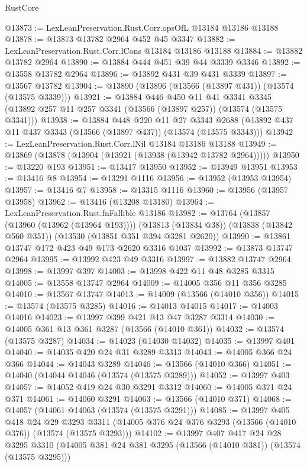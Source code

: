 \begin{lexlean}{RustCore}
\begin{coremodule}
@13873 := LexLeanPreservation.Rust.Corr.opsOfL @13184 @13186 @13188
@13878 := @13873 @13782 @2964 @452 @45 @3347
@13882 := LexLeanPreservation.Rust.Corr.lCons @13184 @13186 @13188
@13884 := @13882 @13782 @2964
@13890 := @13884 @444 @451 @39 @44 @3339 @3346
@13892 := @13558 @13782 @2964
@13896 := @13892 @431 @39 @431 @3339
@13897 := @13567 @13782
@13904 := @13890 (@13896 (@13566 (@13897 @431)) (@13574 (@13575 @3339)))
@13921 := @13884
    @446
    @450
    @11
    @41
    @3341
    @3345
    (@13892 @257 @11 @257 @3341 (@13566 (@13897 @257)) (@13574 (@13575 @3341)))
@13938 := @13884
    @448
    @220
    @11
    @27
    @3343
    @2688
    (@13892 @437 @11 @437 @3343 (@13566 (@13897 @437)) (@13574 (@13575 @3343)))
@13942 := LexLeanPreservation.Rust.Corr.lNil @13184 @13186 @13188
@13949 := @13869 (@13878 (@13904 (@13921 (@13938 (@13942 @13782 @2964)))))
@13950 := @13220 @193
@13951 := @13417 @13950
@13952 := @13949 @13951
@13953 := @13416 @8
@13954 := @13291 @1116
@13956 := @13952 (@13953 @13954)
@13957 := @13416 @7
@13958 := @13315 @1116
@13960 := @13956 (@13957 @13958)
@13962 := @13416 (@13208 @13180)
@13964 := LexLeanPreservation.Rust.fnFallible @13186
@13982 := @13764
    (@13857 (@13960 (@13962 (@13964 @193))))
    (@13813 (@13834 @38))
    (@13838 (@13842 @560 @351))
    (@13530 (@13851 @351 @394 @3281 @2620))
@13990 := @13861 @13747 @172 @423 @49 @173 @2620 @3316 @1037
@13992 := @13873 @13747 @2964
@13995 := @13992 @423 @49 @3316
@13997 := @13882 @13747 @2964
@13998 := @13997 @397
@14003 := @13998 @422 @11 @48 @3285 @3315
@14005 := @13558 @13747 @2964
@14009 := @14005 @356 @11 @356 @3285
@14010 := @13567 @13747
@14013 := @14009 (@13566 (@14010 @356))
@14015 := @13574 (@13575 @3285)
@14016 := @14013 @14015
@14017 := @14003 @14016
@14023 := @13997 @399 @421 @13 @47 @3287 @3314
@14030 := @14005 @361 @13 @361 @3287 (@13566 (@14010 @361))
@14032 := @13574 (@13575 @3287)
@14034 := @14023 (@14030 @14032)
@14035 := @13997 @401
@14040 := @14035 @420 @24 @31 @3289 @3313
@14043 := @14005 @366 @24 @366
@14044 := @14043 @3289
@14046 := @13566 (@14010 @366)
@14051 := @14040 (@14044 @14046 (@13574 (@13575 @3289)))
@14052 := @13997 @403
@14057 := @14052 @419 @24 @30 @3291 @3312
@14060 := @14005 @371 @24 @371
@14061 := @14060 @3291
@14063 := @13566 (@14010 @371)
@14068 := @14057 (@14061 @14063 (@13574 (@13575 @3291)))
@14085 := @13997
    @405
    @418
    @24
    @29
    @3293
    @3311
    (@14005 @376 @24 @376 @3293 (@13566 (@14010 @376)) (@13574 (@13575 @3293)))
@14102 := @13997
    @407
    @417
    @24
    @28
    @3295
    @3310
    (@14005 @381 @24 @381 @3295 (@13566 (@14010 @381)) (@13574 (@13575 @3295)))

\end{coremodule}
\end{lexlean}
